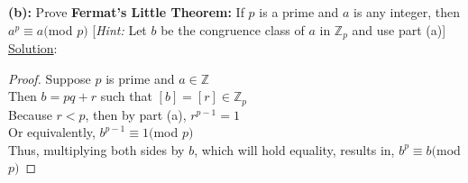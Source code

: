 \documentclass{article} %
\begin{document}
\textbf{(b): } Prove \textbf{Fermat's Little Theorem:} If $p$ is a prime and $a$ is any integer, then $a^p \equiv a ($mod $p)$ [\textit{Hint:} Let $b$ be the congruence class of $a$ in $\mathbb{Z}_p$ and use part (a)]
\\

\underline{Solution}: 
\begin{addmargin}[1em]{0em}
\begin{proof}
Suppose $p$ is prime and $a \in \mathbb{Z}$
\\Then $b = pq+r$ such that $[b] = [r] \in \mathbb{Z}_p$
\\Because $r < p$, then by part (a), $r^{p-1} = 1$
\\Or equivalently, $b^{p-1} \equiv 1 ($mod $p)$
\\Thus, multiplying both sides by $b$, which will hold equality, results in, $b^p \equiv b($mod $p)$
\end{proof}
\end{addmargin}    

\newpage
\end{document}

